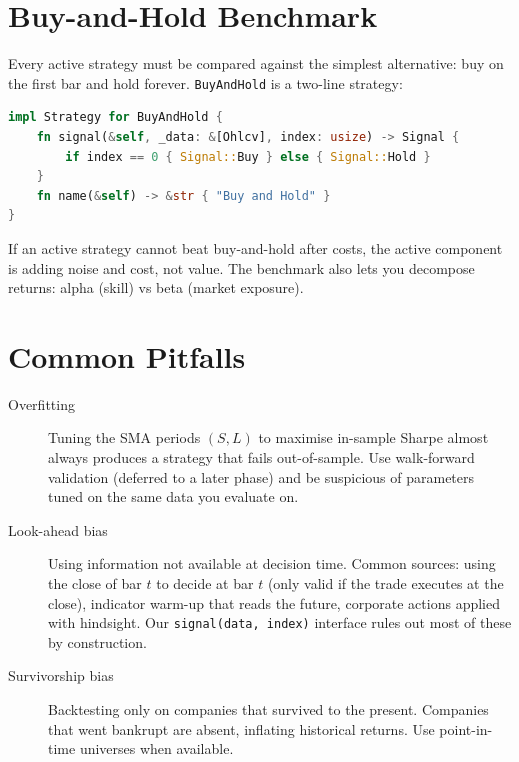 \section{Buy-and-Hold Benchmark}


Every active strategy must be compared against the simplest alternative: buy
on the first bar and hold forever. \texttt{BuyAndHold} is a two-line strategy:

\begin{lstlisting}[language=Rust]
impl Strategy for BuyAndHold {
    fn signal(&self, _data: &[Ohlcv], index: usize) -> Signal {
        if index == 0 { Signal::Buy } else { Signal::Hold }
    }
    fn name(&self) -> &str { "Buy and Hold" }
}
\end{lstlisting}

If an active strategy cannot beat buy-and-hold after costs, the active
component is adding noise and cost, not value. The benchmark also lets you
decompose returns: alpha (skill) vs beta (market exposure).

\section{Common Pitfalls}


\begin{description}
    \item[Overfitting] Tuning the SMA periods $(S, L)$ to maximise in-sample
      Sharpe almost always produces a strategy that fails out-of-sample. Use
      walk-forward validation (deferred to a later phase) and be suspicious of
      parameters tuned on the same data you evaluate on.
    \item[Look-ahead bias] Using information not available at decision time.
      Common sources: using the close of bar $t$ to decide at bar $t$ (only
      valid if the trade executes at the close), indicator warm-up that reads
      the future, corporate actions applied with hindsight. Our
      \texttt{signal(data, index)} interface rules out most of these by
      construction.
    \item[Survivorship bias] Backtesting only on companies that survived to the
      present. Companies that went bankrupt are absent, inflating historical
      returns. Use point-in-time universes when available.
\end{description}

